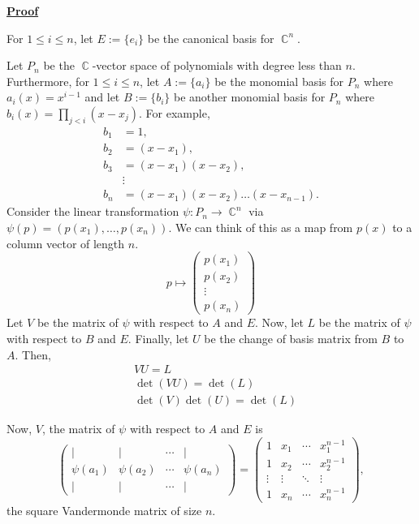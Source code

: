 \documentclass[a4paper, 11pt]{book}
\newcommand{\proof}{\underline{\textbf{Proof}} }
\DeclareMathOperator{\C}{\mathbb{C}}
\begin{document}
\begin{mybox}
\end{mybox}

\proof{For $1 \leq i \leq n$, let $E := {\{e_i\}}$ be the canonical basis for ${\C}^{n}$.\par

    Let $P_n$ be the $\C$-vector space of polynomials with degree less than $n$. Furthermore, for $1 \leq i \leq n$, let $A := \{a_i\}$ be the monomial basis for $P_n$ where $a_i(x) = x^{i-1}$ and let $B := \{b_i\}$ be another monomial basis for $P_n$ where $b_i(x) = \prod\limits_{j < i} (x-x_j)$. For example, 
\begin{align*}
    b_1 &= 1, \\ 
    b_2 &= (x - x_1), \\ 
    b_3 &= (x - x_1)(x - x_2), \\
        &\vdots \\
    b_n &= (x - x_1)(x - x_2) \ldots (x - x_{n-1}).
\end{align*}
Consider the linear transformation $\psi : P_n \to \C^n$ via $\psi(p) = (p(x_1), \ldots, p(x_n))$. We can think of this as a map from $p(x)$ to a column vector of length $n$. 
\[
    p \mapsto 
    \begin{pmatrix}
        p(x_1) \\
        p(x_2) \\
        \vdots \\
        p(x_n)
    \end{pmatrix}
\]
Let $V$ be the matrix of $\psi$ with respect to $A$ and $E$. Now, let $L$ be the matrix of $\psi$ with respect to $B$ and $E$. Finally, let $U$ be the change of basis matrix from $B$ to $A$. Then, 
\begin{align*}
    &VU = L \\
    &\det(VU) = \det(L) \\
    &\det(V)\det(U) = \det(L)
\end{align*}

Now, $V$, the matrix of $\psi$ with respect to $A$ and $E$ is  
\[\begin{pmatrix}
    \vert & \vert &\cdots & \vert \\
    \psi(a_1) & \psi(a_2) &\cdots & \psi(a_n) \\
    \vert & \vert &\cdots & \vert
\end{pmatrix} = 
\begin{pmatrix}
    1 & x_1 & \cdots & x_1^{n-1} \\
    1 & x_2 & \cdots & x_2^{n-1} \\
    \vdots & \vdots & \ddots & \vdots \\
    1 & x_n & \cdots & x_n^{n-1}
\end{pmatrix},\] 
the square Vandermonde matrix of size $n$.\par

}
\end{document}
